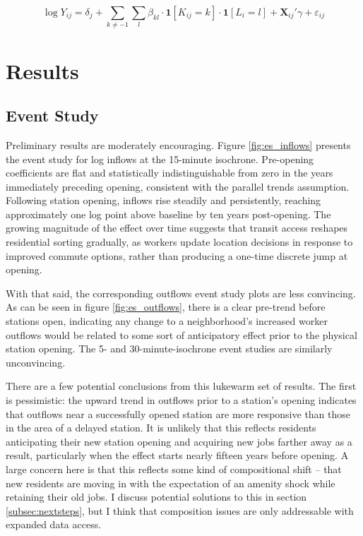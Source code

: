 \documentclass[12pt]{article}
\begin{document}
$$\log Y_{ij} = \delta_j + \sum_{k \neq -1} \sum_l \beta_{kl} \cdot \mathbf{1}[K_{ij} = k] \cdot \mathbf{1}[L_i = l] + \mathbf{X}_{ij}'\gamma + \varepsilon_{ij}$$

\section{Results}
\subsection{Event Study}\label{subsec:es}
Preliminary results are moderately encouraging. Figure \ref{fig:es_inflows} presents the event study for log inflows at the 15-minute isochrone. Pre-opening coefficients are flat and statistically indistinguishable from zero in the years immediately preceding opening, consistent with the parallel trends assumption. Following station opening, inflows rise steadily and persistently, reaching approximately one log point above baseline by ten years post-opening. The growing magnitude of the effect over time suggests that transit access reshapes residential sorting gradually, as workers update location decisions in response to improved commute options, rather than producing a one-time discrete jump at opening.

With that said, the corresponding outflows event study plots are less convincing. As can be seen in figure \ref{fig:es_outflows}, there is a clear pre-trend before stations open, indicating any change to a neighborhood's increased worker outflows would be related to some sort of anticipatory effect prior to the physical station opening. The 5- and 30-minute-isochrone event studies are similarly unconvincing. 

There are a few potential conclusions from this lukewarm set of results. The first is pessimistic: the upward trend in outflows prior to a station's opening indicates that outflows near a successfully opened station are more responsive than those in the area of a delayed station. It is unlikely that this reflects residents anticipating their new station opening and acquiring new jobs farther away as a result, particularly when the effect starts nearly fifteen years before opening. A large concern here is that this reflects some kind of compositional shift -- that new residents are moving in with the expectation of an amenity shock while retaining their old jobs. I discuss potential solutions to this in section \ref{subsec:nextsteps}, but I think that composition issues are only addressable with expanded data access.
\end{document}
